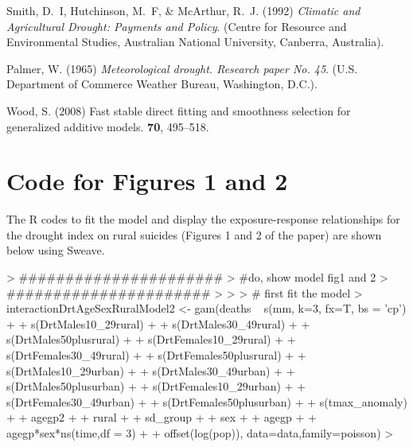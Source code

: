 \documentclass[a4paper]{article}                %
\begin{document}
        \begin{thebibliography}{1}

        Smith, D.~I, Hutchinson, M.~F,  \& McArthur, R.~J.
        \newblock (1992) {\em {Climatic and Agricultural Drought: Payments and
        Policy}}.
        \newblock (Centre for Resource and Environmental Studies, Australian National
        University, Canberra, Australia).

        Palmer, W.
        \newblock (1965) {\em {Meteorological drought. Research paper No. 45}}.
        \newblock (U.S. Department of Commerce Weather Bureau, Washington, D.C.).

        Wood, S.
        \newblock (2008) {Fast stable direct fitting and smoothness selection for
        generalized additive models}.
         {\bf 70}, 495--518.

        \end{thebibliography}



\singlespace
        \clearpage
        \section{Code for Figures 1 and 2}
        The R codes to fit the model and display the exposure-response relationships for the drought index on rural suicides (Figures 1 and 2 of the paper) are shown below using Sweave.

\begin{Schunk}
\begin{Sinput}
> ######################
> #do,  show model fig1 and 2
> ######################
> 
> 
> # first fit the model
>         interactionDrtAgeSexRuralModel2 <- gam(deaths ~  s(mm, k=3, fx=T, bs = 'cp')
+         + s(DrtMales10_29rural)
+         + s(DrtMales30_49rural)
+         + s(DrtMales50plusrural)
+         + s(DrtFemales10_29rural)
+         + s(DrtFemales30_49rural)
+         + s(DrtFemales50plusrural)
+         + s(DrtMales10_29urban)
+         + s(DrtMales30_49urban)
+         + s(DrtMales50plusurban)
+         + s(DrtFemales10_29urban)
+         + s(DrtFemales30_49urban)
+         + s(DrtFemales50plusurban)
+         + s(tmax_anomaly)
+         + agegp2
+         + rural
+         + sd_group
+         + sex
+         + agegp
+         + agegp*sex*ns(time,df = 3)
+         + offset(log(pop)), data=data,family=poisson)
> 
\end{Sinput}
\end{Schunk}
\end{document}
